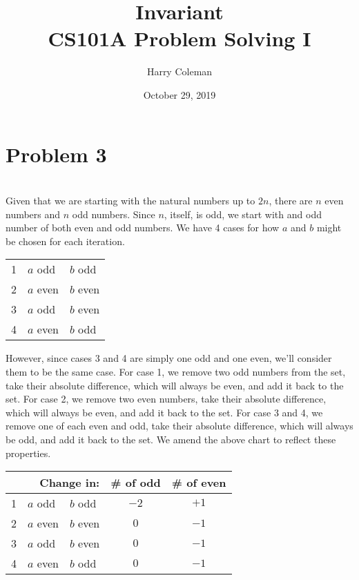 \documentclass[12pt]{article}
\begin{document}
 
\title{Invariant\\
    \large CS101A Problem Solving I}
\author{Harry Coleman}
\date{October 29, 2019}

\maketitle

\section*{Problem 3}
\\

Given that we are starting with the natural numbers up to $2n$, there are $n$ even numbers and $n$ odd numbers. Since $n$, itself, is odd, we start with and odd number of both even and odd numbers. We have 4 cases for how $a$ and $b$ might be chosen for each iteration.
\begin{center}
    \begin{tabular}{c l l}
        1 & $a$ odd & $b$ odd \\
        2 & $a$ even & $b$ even \\
        3 & $a$ odd & $b$ even \\
        4 & $a$ even & $b$ odd \\
    \end{tabular}
\end{center}

However, since cases 3 and 4 are simply one odd and one even, we'll consider them to be the same case. For case 1, we remove two odd numbers from the set, take their absolute difference, which will always be even, and add it back to the set. For case 2, we remove two even numbers, take their absolute difference, which will always be even, and add it back to the set. For case 3 and 4, we remove one of each even and odd, take their absolute difference, which will always be odd, and add it back to the set. We amend the above chart to reflect these properties.
\begin{center}
    \begin{tabular}{c l l|c c}
        \multicolumn{3}{r}{Change in:}& \# of odd & \# of even \\
        \hline
        1 & $a$ odd & $b$ odd & $-2$ & $+1$\\
        2 & $a$ even & $b$ even & $0$ & $-1$\\
        3 & $a$ odd & $b$ even & $0$ & $-1$\\
        4 & $a$ even & $b$ odd & $0$ & $-1$\\
    \end{tabular}
\end{center}
\end{document}

